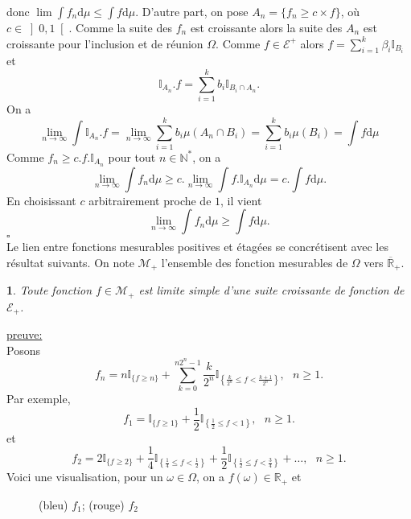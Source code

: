 \documentclass[8pt,notheorems]{beamer}
\def \N{\mathbb N}
\def \R{\mathbb{R}}
\def \Om{\Omega}
\newtheorem{theorem}{\translate{Theorem}}[section]
\newtheorem{theorem}{\translate{Theoreme}}
\theoremstyle{definition}
\theoremstyle{example}
\theoremstyle{mystyle}
\theoremstyle{plain}
\begin{document}
\begin{frame}[allowframebreaks]
$$$$
donc $\lim \int f_n\text{d}\mu \leq \int f\text{d}\mu$. D'autre part, on pose $A_n = \{f_n \geq c\times f\}$, où $c\in \left]0,1\right[$. Comme la suite des $f_n$ est croissante alors la suite des $A_n$ est croissante pour l'inclusion et de réunion $\Omega$. Comme $f\in \mathcal{E}^+$ alors $f = \sum_{i = 1}^{k}\beta_i\mathbb{I}_{B_i}$ et 
$$
\mathbb{I}_{A_n}.f = \sum_{i = 1}^{k}b_i\mathbb{I}_{B_i\cap A_n}.
$$
On a 
$$
\underset{n\rightarrow \infty}{\lim} \int \mathbb{I}_{A_n}.f = \underset{n\rightarrow \infty}{\lim} \sum_{i = 1}^kb_i\mu(A_n\cap B_i) = \sum_{i = 1}^kb_i\mu( B_i) = \int f\text{d}\mu
$$
Comme $f_n \geq c.f.\mathbb{I}_{A_n}$ pour tout $n\in \N^{\ast}$, on a 
$$
\underset{n\rightarrow \infty}{\lim} \int f_n\text{d}\mu\geq c. \underset{n\rightarrow \infty}{\lim} \int f.\mathbb{I}_{A_n}\text{d}\mu = c. \int f\text{d}\mu.
$$
En choisissant $c$ arbitrairement proche de $1$, il vient 
$$
\underset{n\rightarrow \infty}{\lim} \int f_n\text{d}\mu\geq \int f\text{d}\mu.
$$
$\square$\\
Le lien entre fonctions mesurables positives et étagées se concrétisent avec les résultat suivants. On note $\mathcal{M}_+$ l'ensemble des fonction mesurables de $\Om$ vers $\overline{\R}_{+}$.
\begin{theorem}
Toute fonction $f\in\mathcal{M}_{+}$ est limite simple d'une suite croissante de fonction de $\mathcal{E}_+$.
\end{theorem}
\flushleft
\underline{preuve:}\\
Posons
$$
f_n=n\mathbb{I}_{\{f\geq n\}}+\sum_{k=0}^{n2^{n}-1}\frac{k}{2^{n}}\mathbb{I}_{\left\{\frac{k}{2^{n}}\leq f<\frac{k+1}{2^{n}}\right\}},\text{ }n\geq1.
$$
Par exemple,
$$
f_1=\mathbb{I}_{\{f\geq 1\}}+\frac{1}{2}\mathbb{I}_{\left\{\frac{1}{2}\leq f<1\right\}},\text{ }n\geq1.
$$
et
$$
f_2=2\mathbb{I}_{\{f\geq 2\}}+\frac{1}{4}\mathbb{I}_{\left\{\frac{1}{4}\leq f<\frac{1}{2}\right\}}+\frac{1}{2}\mathbb{I}_{\left\{\frac{1}{2}\leq f<\frac{3}{4}\right\}}+\ldots,\text{ }n\geq1.
$$
Voici une visualisation, pour un $\omega\in \Omega$, on a $f(\omega)\in \R_+$ et
\begin{figure}
\begin{center}
\caption{(bleu) $f_1$; (rouge) $f_2$}
\end{center}
\end{figure}


\end{frame}
\end{document}
